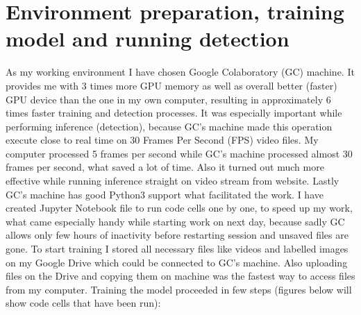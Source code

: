 \section{Environment preparation, training model and running detection}
\label{sec:env}
As my working environment I have chosen Google Colaboratory (GC) machine. It provides me with 3 times more GPU memory as well as overall better (faster) GPU device than the one in my own computer, resulting in approximately 6 times faster training and detection processes. It was especially important while performing inference (detection), because GC's machine made this operation execute close to real time on 30 Frames Per Second (FPS) video files. My computer processed 5 frames per second while GC's machine processed almost 30 frames per second, what saved a lot of time. Also it turned out much more effective while running inference straight on video stream from website. Lastly GC's machine has good Python3 support what facilitated the work. I have created Jupyter Notebook file to run code cells one by one, to speed up my work, what came especially handy while starting work on next day, because sadly GC allows only few hours of inactivity before restarting session and unsaved files are gone. To start training I stored all necessary files like videos and labelled images on my Google Drive which could be connected to GC's machine. Also uploading files on the Drive and copying them on machine was the fastest way to access files from my computer. Training the model proceeded in few steps (figures below will show code cells that have been run):
